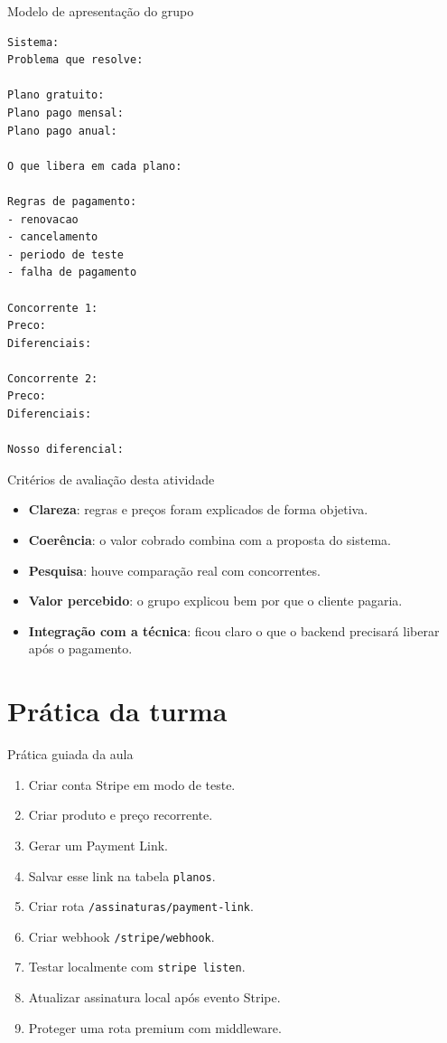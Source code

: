 \documentclass[aspectratio=169]{beamer}
\newcommand{\code}[1]{\texttt{#1}}
\begin{document}
\begin{frame}[fragile]{Modelo de apresentação do grupo}
\begin{lstlisting}[language={}]
Sistema:
Problema que resolve:

Plano gratuito:
Plano pago mensal:
Plano pago anual:

O que libera em cada plano:

Regras de pagamento:
- renovacao
- cancelamento
- periodo de teste
- falha de pagamento

Concorrente 1:
Preco:
Diferenciais:

Concorrente 2:
Preco:
Diferenciais:

Nosso diferencial:
\end{lstlisting}
\end{frame}

\begin{frame}{Critérios de avaliação desta atividade}
\begin{itemize}
  \item \textbf{Clareza}: regras e preços foram explicados de forma objetiva.
  \item \textbf{Coerência}: o valor cobrado combina com a proposta do sistema.
  \item \textbf{Pesquisa}: houve comparação real com concorrentes.
  \item \textbf{Valor percebido}: o grupo explicou bem por que o cliente pagaria.
  \item \textbf{Integração com a técnica}: ficou claro o que o backend precisará liberar após o pagamento.
\end{itemize}
\end{frame}

\section{Prática da turma}

\begin{frame}{Prática guiada da aula}
\begin{enumerate}
  \item Criar conta Stripe em modo de teste.
  \item Criar produto e preço recorrente.
  \item Gerar um Payment Link.
  \item Salvar esse link na tabela \code{planos}.
  \item Criar rota \code{/assinaturas/payment-link}.
  \item Criar webhook \code{/stripe/webhook}.
  \item Testar localmente com \code{stripe listen}.
  \item Atualizar assinatura local após evento Stripe.
  \item Proteger uma rota premium com middleware.
\end{enumerate}
\end{frame}
\end{document}
